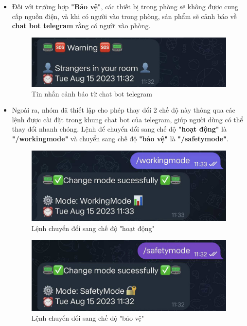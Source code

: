 \documentclass{report}
\begin{document}
\begin{itemize}
    \item Đối với trường hợp \textbf{"Bảo vệ"}, các thiết bị trong phòng sẽ không được cung cấp nguồn điện, và khi có người vào trong phòng, sản phẩm sẽ cảnh báo về \textbf{chat bot telegram} rằng có người vào phòng.
    \begin{figure}[H]
        \includegraphics[width=\textwidth, keepaspectratio]{img/warning.jpg}
        \centering
        \caption{Tin nhắn cảnh báo từ chat bot telegram}
    \end{figure}
    

    \item Ngoài ra, nhóm đã thiết lập cho phép thay đổi 2 chế độ này thông qua các lệnh được cài đặt trong khung chat bot của telegram, giúp người dùng có thể thay đổi nhanh chóng. Lệnh để  chuyển đổi sang chế độ \textbf{"hoạt động"} là \textbf{"/workingmode"} và chuyển sang chế độ \textbf{"bảo vệ"} là \textbf{"/safetymode"}.
    \begin{figure}[H]
        \includegraphics[width=\textwidth, keepaspectratio]{img/change_work.jpg}
        \centering
        \caption{Lệnh chuyển đổi sang chế độ "hoạt động"}
    \end{figure}

    \begin{figure}[H]
        \includegraphics[width=\textwidth, keepaspectratio]{img/change_safe.jpg}
        \centering
        \caption{Lệnh chuyển đổi sang chế độ "bảo vệ"}
    \end{figure}
    

\end{itemize}
\end{document}
